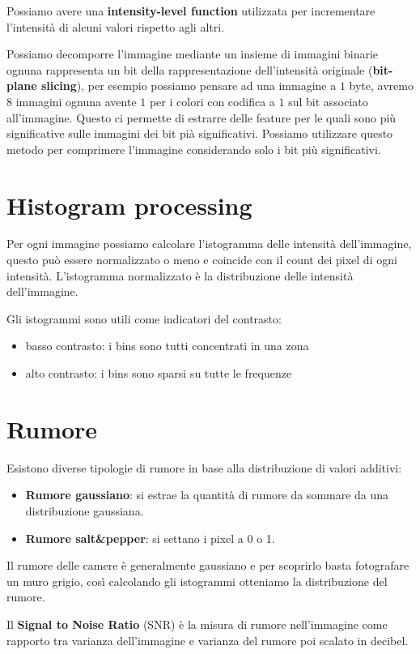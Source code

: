 Possiamo avere una \textbf{intensity-level function} utilizzata per incrementare l'intensità
di alcuni valori rispetto agli altri.

Possiamo decomporre l'immagine mediante un insieme di immagini binarie ognuna
rappresenta un bit della rappresentazione dell'intensità originale (\textbf{bit-plane
    slicing}), per esempio possiamo pensare ad una immagine a $1$ byte, avremo
$8$ immagini ognuna avente $1$ per i colori con codifica a $1$ sul bit associato
all'immagine. Questo ci permette di estrarre delle feature per le quali sono più
significative sulle immagini dei bit pià significativi. Possiamo utilizzare
questo metodo per comprimere l'immagine considerando solo i bit più significativi.

\section{Histogram processing}
Per ogni immagine possiamo calcolare l'istogramma delle intensità dell'immagine,
questo può essere normalizzato o meno e coincide con il count dei pixel di ogni
intensità. L'istogramma normalizzato è la distribuzione delle intensità dell'immagine.

Gli istogrammi sono utili come indicatori del contrasto:
\begin{itemize}
    \item basso contrasto: i bins sono tutti concentrati in una zona
    \item alto contrasto: i bins sono sparsi su tutte le frequenze
\end{itemize}

\section{Rumore}
Esistono diverse tipologie di rumore in base alla distribuzione di valori additivi:
\begin{itemize}
    \item \textbf{Rumore gaussiano}: si estrae la quantità di rumore da sommare
          da una distribuzione gaussiana.
    \item \textbf{Rumore salt\&pepper}: si settano i pixel a 0 o 1.
\end{itemize}

Il rumore delle camere è generalmente gaussiano e per scoprirlo basta fotografare
un muro grigio, così calcolando gli istogrammi otteniamo la distribuzione del rumore.

Il \textbf{Signal to Noise Ratio} (SNR) è la misura di rumore nell'immagine come
rapporto tra varianza dell'immagine e varianza del rumore poi scalato in decibel.

